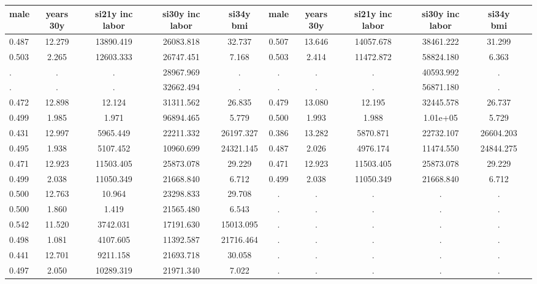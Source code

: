 \begin{table}[htbp]
\begin{tabular}{lcccccccccc} \hline \hline
 \multicolumn{1}{c}{ male }  & years 30y  & si21y inc labor  & si30y inc labor  & si34y bmi  & male  & years 30y  & si21y inc labor  & si30y inc labor  & si34y bmi  \\  \hline 
    0.487 &    12.279 & 13890.419 & 26083.818 &    32.737 &     0.507 &    13.646 & 14057.678 & 38461.222 &    31.299 \\  
    0.503 &     2.265 & 12603.333 & 26747.451 &     7.168 &     0.503 &     2.414 & 11472.872 & 58824.180 &     6.363 \\  
        . &         . &         . & 28967.969 &         . &         . &         . &         . & 40593.992 &         . \\  
        . &         . &         . & 32662.494 &         . &         . &         . &         . & 56871.180 &         . \\  
    0.472 &    12.898 &    12.124 & 31311.562 &    26.835 &     0.479 &    13.080 &    12.195 & 32445.578 &    26.737 \\  
    0.499 &     1.985 &     1.971 & 96894.465 &     5.779 &     0.500 &     1.993 &     1.988 &  1.01e+05 &     5.729 \\  
    0.431 &    12.997 &  5965.449 & 22211.332 & 26197.327 &     0.386 &    13.282 &  5870.871 & 22732.107 & 26604.203 \\  
    0.495 &     1.938 &  5107.452 & 10960.699 & 24321.145 &     0.487 &     2.026 &  4976.174 & 11474.550 & 24844.275 \\  
    0.471 &    12.923 & 11503.405 & 25873.078 &    29.229 &     0.471 &    12.923 & 11503.405 & 25873.078 &    29.229 \\  
    0.499 &     2.038 & 11050.349 & 21668.840 &     6.712 &     0.499 &     2.038 & 11050.349 & 21668.840 &     6.712 \\  
    0.500 &    12.763 &    10.964 & 23298.833 &    29.708 &         . &         . &         . &         . &         . \\  
    0.500 &     1.860 &     1.419 & 21565.480 &     6.543 &         . &         . &         . &         . &         . \\  
    0.542 &    11.520 &  3742.031 & 17191.630 & 15013.095 &         . &         . &         . &         . &         . \\  
    0.498 &     1.081 &  4107.605 & 11392.587 & 21716.464 &         . &         . &         . &         . &         . \\  
    0.441 &    12.701 &  9211.158 & 21693.718 &    30.058 &         . &         . &         . &         . &         . \\  
    0.497 &     2.050 & 10289.319 & 21971.340 &     7.022 &         . &         . &         . &         . &         . \\  
\hline \hline \end{tabular}
\end{table}
